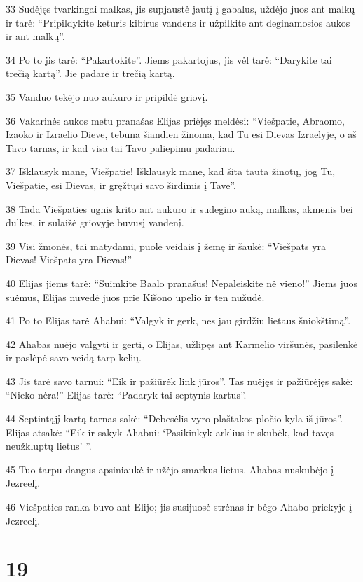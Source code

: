 \par 33 Sudėjęs tvarkingai malkas, jis supjaustė jautį į gabalus, uždėjo juos ant malkų ir tarė: “Pripildykite keturis kibirus vandens ir užpilkite ant deginamosios aukos ir ant malkų”. 
\par 34 Po to jis tarė: “Pakartokite”. Jiems pakartojus, jis vėl tarė: “Darykite tai trečią kartą”. Jie padarė ir trečią kartą. 
\par 35 Vanduo tekėjo nuo aukuro ir pripildė griovį. 
\par 36 Vakarinės aukos metu pranašas Elijas priėjęs meldėsi: “Viešpatie, Abraomo, Izaoko ir Izraelio Dieve, tebūna šiandien žinoma, kad Tu esi Dievas Izraelyje, o aš Tavo tarnas, ir kad visa tai Tavo paliepimu padariau. 
\par 37 Išklausyk mane, Viešpatie! Išklausyk mane, kad šita tauta žinotų, jog Tu, Viešpatie, esi Dievas, ir gręžtųsi savo širdimis į Tave”. 
\par 38 Tada Viešpaties ugnis krito ant aukuro ir sudegino auką, malkas, akmenis bei dulkes, ir sulaižė griovyje buvusį vandenį. 
\par 39 Visi žmonės, tai matydami, puolė veidais į žemę ir šaukė: “Viešpats yra Dievas! Viešpats yra Dievas!” 
\par 40 Elijas jiems tarė: “Suimkite Baalo pranašus! Nepaleiskite nė vieno!” Jiems juos suėmus, Elijas nuvedė juos prie Kišono upelio ir ten nužudė. 
\par 41 Po to Elijas tarė Ahabui: “Valgyk ir gerk, nes jau girdžiu lietaus šniokštimą”. 
\par 42 Ahabas nuėjo valgyti ir gerti, o Elijas, užlipęs ant Karmelio viršūnės, pasilenkė ir paslėpė savo veidą tarp kelių. 
\par 43 Jis tarė savo tarnui: “Eik ir pažiūrėk link jūros”. Tas nuėjęs ir pažiūrėjęs sakė: “Nieko nėra!” Elijas tarė: “Padaryk tai septynis kartus”. 
\par 44 Septintąjį kartą tarnas sakė: “Debesėlis vyro plaštakos pločio kyla iš jūros”. Elijas atsakė: “Eik ir sakyk Ahabui: ‘Pasikinkyk arklius ir skubėk, kad tavęs neužkluptų lietus’ ”. 
\par 45 Tuo tarpu dangus apsiniaukė ir užėjo smarkus lietus. Ahabas nuskubėjo į Jezreelį. 
\par 46 Viešpaties ranka buvo ant Elijo; jis susijuosė strėnas ir bėgo Ahabo priekyje į Jezreelį.



\chapter{19}


